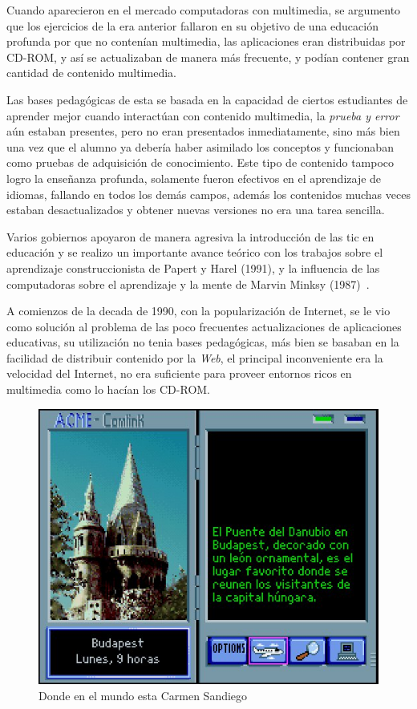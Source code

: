 Cuando aparecieron en el mercado computadoras con multimedia, se argumento que
los ejercicios de la era anterior fallaron en su objetivo de una educación
profunda por que no contenían multimedia\cite{leinonen:ict}, las aplicaciones
eran distribuidas por CD-ROM, y así se actualizaban de manera más frecuente, y
podían contener gran cantidad de contenido multimedia.

Las bases pedagógicas de esta se basada en la capacidad de ciertos estudiantes
de aprender mejor cuando interactúan con contenido multimedia, la \emph{prueba y
	error} aún estaban presentes, pero no eran presentados inmediatamente,
sino más bien una vez que el alumno ya debería haber asimilado los conceptos y
funcionaban como pruebas de adquisición de conocimiento. Este tipo de contenido
tampoco logro la enseñanza profunda, solamente fueron efectivos en el
aprendizaje de idiomas, fallando en todos los demás campos\cite{leinonen:ict},
además los contenidos muchas veces estaban desactualizados y obtener nuevas
versiones no era una tarea sencilla.

Varios gobiernos apoyaron de manera agresiva la introducción de las \Gls{tic} en
educación\cite{mcdougall2006theory} y se realizo un importante avance teórico
con los trabajos sobre el aprendizaje construccionista de Papert y Harel (1991),
y la influencia de las computadoras sobre el aprendizaje y la mente de Marvin
Minksy (1987)~\cite{mcdougall2006theory}.

A comienzos de la decada de 1990, con la popularización de Internet, se le vio
como solución al problema de las poco frecuentes actualizaciones de aplicaciones
educativas, su utilización no tenia bases pedagógicas, más bien se basaban en la
facilidad de distribuir contenido por la \emph{Web}, el principal inconveniente
era la velocidad del Internet, no era suficiente para proveer entornos ricos en
multimedia como lo hacían los CD-ROM\cite{leinonen:ict}.

\begin{figure}[ht!] 
	\centering 
	\includegraphics[scale=0.5]{tics/carmen.jpg}
	\caption{Donde en el mundo esta Carmen Sandiego} 
	\label{fig:carmen}
\end{figure}

